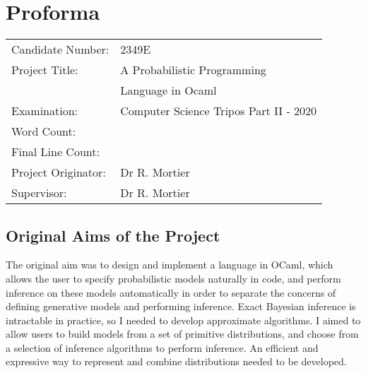 \immediate{}
\immediate{}
\chapter*{Proforma}
{\large
	\begin{tabular}{ll}
		Candidate Number:   & 2349E                                  \\
		Project Title:      & A Probabilistic Programming            \\
		                    & Language in Ocaml                      \\
		Examination:        & Computer Science Tripos Part II - 2020 \\
		Word Count:         & \footnotemark[1]  \\
		Final Line Count:   & \footnotemark[2]  \\
		Project Originator: & Dr R. Mortier                          \\
		Supervisor:         & Dr R. Mortier                          \\
	\end{tabular}
}


\section*{Original Aims of the Project}

The original aim was to design and implement a language in OCaml, which allows the user to specify probabilistic models naturally in code, and perform inference on these models automatically in order to separate the concerns of defining generative models and performing inference. Exact Bayesian inference is intractable in practice, so I needed to develop approximate algorithms. I aimed to allow users to build models from a set of primitive distributions, and choose from a selection of inference algorithms to perform inference. An efficient and expressive way to represent and combine distributions needed to be developed.

